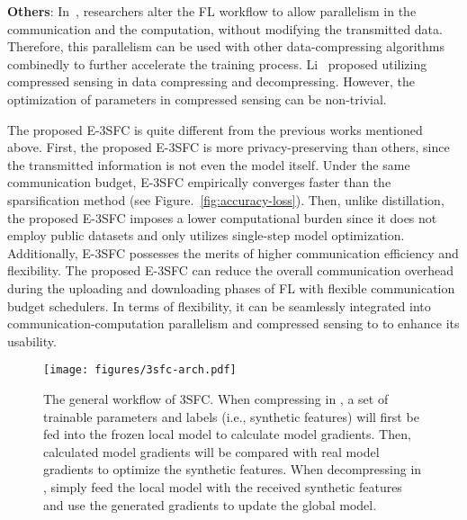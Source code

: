 \noindent\textbf{Others}:
In~\cite{chen2019communication,zhou2021communication}, researchers alter the FL workflow to allow parallelism in the communication and the computation, without modifying the transmitted data.
Therefore, this parallelism can be used with other data-compressing algorithms combinedly to further accelerate the training process. Li~\cite{li2021communication} proposed utilizing compressed sensing in data compressing and decompressing.
However, the optimization of parameters in compressed sensing can be non-trivial. 

The proposed E-3SFC is quite different from the previous works mentioned above.
First, the proposed E-3SFC is more privacy-preserving than others, since the transmitted information is not even the model itself.
Under the same communication budget, E-3SFC empirically converges faster than the sparsification method (see Figure.~\ref{fig:accuracy-loss}).
Then, unlike distillation, the proposed E-3SFC imposes a lower computational burden since it does not employ public datasets and only utilizes single-step model optimization.
Additionally, E-3SFC possesses the merits of higher communication efficiency and flexibility.
The proposed E-3SFC can reduce the overall communication overhead during the uploading and downloading phases of FL with flexible communication budget schedulers.
In terms of flexibility, it can be seamlessly integrated into communication-computation parallelism and compressed sensing to to enhance its usability.


\begin{figure*}[!h]
    \centering
    \texttt{[image: figures/3sfc-arch.pdf]}
    \caption{The general workflow of 3SFC. When compressing in , a set of trainable parameters and labels (i.e., synthetic features) will first be fed into the frozen local model to calculate model gradients. Then, calculated model gradients will be compared with real model gradients to optimize the synthetic features. When decompressing in , simply feed the local model with the received synthetic features and use the generated gradients to update the global model.}
    \label{fig:3sfc-arch}
\end{figure*}
